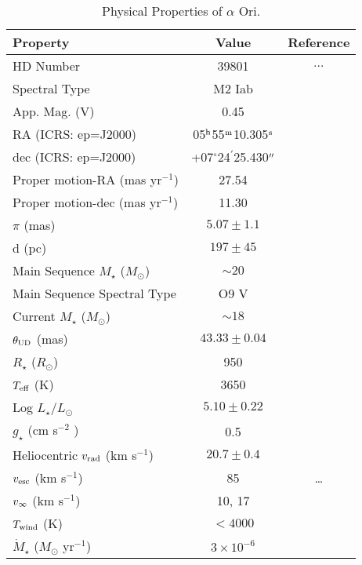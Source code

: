 \begin{table}[!hbt]
\begin{center}
\caption[Physical Properties of $\alpha$ Ori.]
{Physical Properties of $\alpha$ Ori.}
\begin{tabular}{lcc}
\hline
\hline
\rule{0pt}{2.5ex}Property & Value & Reference \\
\hline
\rule{0pt}{2.5ex}HD Number & 39801 & $\ldots$\\
Spectral Type & M2 Iab & \cite{perryman_1997} \\ 
App. Mag. (V) & 0.45 & \cite{perryman_1997}\\
RA (ICRS: ep=J2000)& 05$^{\rm{h}}$55$^{\rm{m}}$10.305$^{\rm{s}}$ & \cite{van_leeuwen_2007}\\
dec (ICRS: ep=J2000) & +07$^{\circ}$24$^{\prime}$25.430$^{\prime\prime}$& \cite{van_leeuwen_2007}\\
Proper motion-RA (mas yr$^{-1}$)& 27.54 & \cite{van_leeuwen_2007}\\
Proper motion-dec (mas yr$^{-1}$)& 11.30 & \cite{van_leeuwen_2007}\\
$\pi$ (mas)& $5.07\pm1.1$ &\cite{harper_2008}\\
d (pc)& $197\pm45$ & \cite{harper_2008}\\
Main Sequence $M_{\star}$ ($M_{\odot}$) & $\sim 20$ & \cite{meynet_2003}\\
Main Sequence Spectral Type & O9 V & \cite{harper_2008}\\
Current $M_{\star}$ ($M_{\odot}$) & $\sim 18$ & \cite{meynet_2003}\\
$\theta _{\rm{UD}}$ (mas)& $43.33 \pm 0.04$ & \cite{perrin_2004}\\
$R_{\star}$ ($R_{\odot}$)& 950 & \cite{harper_2008} \\
$T_{\rm{eff}}$ (K)& 3650 & \cite{levesque_2005}\\
Log $L_{\star}/L_{\odot}$& $5.10\pm0.22$  & \cite{harper_2008}\\
$g_{\star}$ (cm s$^{-2}$ )& 0.5 & \cite{meynet_2003} \\
Heliocentric $v_{\rm{rad}}$ (km s$^{-1}$) & $20.7\pm0.4 $& \cite{harper_2008} \\
$v_{\rm{esc}}$ (km s$^{-1}$) & 85 & \dots\\
$v_{\rm{\infty}}$ (km s$^{-1}$)& 10, 17 & \cite{bernat_1979} \\
$T_{\rm{wind}}$ (K)& $< 4000$ & \cite{lim_1998} \\
$\dot{M}_{\star}$ ($M_{\odot}$ yr$^{-1}$)& $3\times 10^{-6}$ &\cite{harper_2001} \\

\end{tabular}
\end{center}
\end{table}
